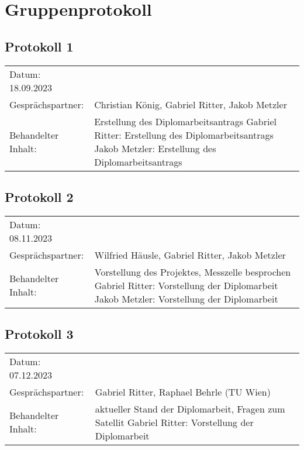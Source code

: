 \chapter{Gruppenprotokoll}

\section*{Protokoll 1}
\begin{tabular}{p{} p{}}
	Datum: 18.09.2023 \\
	Gesprächspartner: & Christian König, Gabriel Ritter, Jakob Metzler \\
	Behandelter Inhalt: & Erstellung des Diplomarbeitsantrags \newline
	Gabriel Ritter: Erstellung des Diplomarbeitsantrags \newline
	Jakob Metzler: Erstellung des Diplomarbeitsantrags \newline
\end{tabular}

\section*{Protokoll 2}
\begin{tabular}{p{} p{}}
	Datum: 08.11.2023 \\
	Gesprächspartner: & Wilfried Häusle, Gabriel Ritter, Jakob Metzler \\
	Behandelter Inhalt: & Vorstellung des Projektes, Messzelle besprochen \newline
	Gabriel Ritter: Vorstellung der Diplomarbeit \newline
	Jakob Metzler: Vorstellung der Diplomarbeit \newline
\end{tabular}

\section*{Protokoll 3}
\begin{tabular}{p{} p{}}
	Datum: 07.12.2023 \\
	Gesprächspartner: & Gabriel Ritter, Raphael Behrle (TU Wien) \\
	Behandelter Inhalt: & aktueller Stand der Diplomarbeit, Fragen zum Satellit \newline
	Gabriel Ritter: Vorstellung der Diplomarbeit \newline
\end{tabular}

